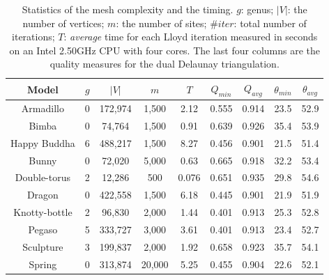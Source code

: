 \begin{table}[t]
\centering
\begin{small}
\tabcolsep=0.1cm
\begin{tabular}{|c||c|c|c|c|c|c|c|c|}
  \hline Model & $g$& $|V|$ & $m$ & $T$ & $Q_{min}$ & $Q_{avg}$ & $\theta_{min}$ & $\theta_{avg}$ \\
  \hline
  \hline Armadillo & 0 & 172,974 & 1,500 & 2.12 & 0.555& 0.914 & 23.5 & 52.9\\
  \hline Bimba &  0    & 74,764  & 1,500  & 0.91 & 0.639& 0.926& 35.4&53.9\\
  \hline Happy Buddha & 6 & 488,217& 1,500& 8.27 & 0.456& 0.901& 21.5&51.4\\
  \hline Bunny & 0 & 72,020 & 5,000& 0.63 & 0.665& 0.918& 32.2& 53.4\\
  \hline Double-torus & 2 & 12,286 & 500& 0.076 & 0.651& 0.935& 29.8& 54.6\\
  \hline Dragon & 0 & 422,558& 1,500& 6.18 &  0.445& 0.901& 21.9& 51.9\\
  \hline Knotty-bottle & 2 & 96,830& 2,000& 1.44 & 0.401& 0.913& 25.3& 52.8\\
  \hline Pegaso & 5 & 333,727& 3,000& 3.61 &  0.401& 0.913& 23.4& 52.7\\
  \hline Sculpture & 3 & 199,837& 2,000& 1.92 & 0.658& 0.923& 35.7& 54.1\\
  \hline Spring & 0 & 313,874 & 20,000& 5.25 & 0.455 & 0.904& 22.6& 52.1\\
  \hline
\end{tabular}
\end{small}
\caption{Statistics of the mesh complexity and the timing. $g$: genus; $|V|$:
the number of vertices; $m$: the number of sites; $\#iter$: total number of
iterations; $T$: \textit{average} time for each Lloyd iteration measured in seconds on an Intel 2.50GHz CPU with four cores. The last four columns are the quality measures for the dual Delaunay triangulation.}
\label{tab:complexity}
\end{table}

